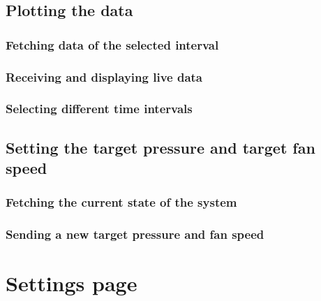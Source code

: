 \subsection{Plotting the data}
\label{subsec:plotting_the_data}


\subsubsection{Fetching data of the selected interval}
\label{subsec:fetching_data_of_the_selected_interval}


\subsubsection{Receiving and displaying live data}
\label{subsec:receiving_and_displaying_live_data}


\subsubsection{Selecting different time intervals}
\label{subsec:selecting_different_time_intervals}



\subsection{Setting the target pressure and target fan speed}
\label{subsec:setting_the_target_pressure_and_target_fan_speed}


\subsubsection{Fetching the current state of the system}
\label{subsec:fetching_the_current_state_of_the_system}


\subsubsection{Sending a new target pressure and fan speed}
\label{subsec:sending_a_new_target_pressure_and_fan_speed}





\section{Settings page}
\label{sec:settings_page}

